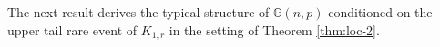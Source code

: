 \documentclass[a4paper,11pt,english,reqno]{amsart}
\numberwithin{equation}{section}
\renewcommand{\geq}{\geqslant}
\newcommand{\UT}{\textup{UT}(\delta)}
\renewcommand{\P}{\mathbb{P}}
\newcommand{\G}{\mathbb{G}}
\newcommand{\tu}[1]{\textup{#1}}
\newcommand{\set}[1]{[\![#1]\!]}
\begin{document}
	The next result derives the typical structure of $\G(n,p)$ conditioned on the upper tail rare event of $K_{1,r}$ in the setting of Theorem \ref{thm:loc-2}.
\end{document}
